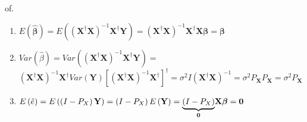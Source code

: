 \documentclass{article}
\begin{document}
\bigskip

of.

\begin{enumerate}
\item $E\left( \mathbf{\hat{\beta}}\right) =E\left( \left( \mathbf{X}%
^{\dagger }\mathbf{X}\right) ^{-1}\mathbf{X}^{\dagger }\mathbf{Y}\right)
=\left( \mathbf{X}^{\dagger }\mathbf{X}\right) ^{-1}\mathbf{X}^{\dagger }%
\mathbf{X\beta =\beta }$

\item $Var\left( \hat{\beta}\right) =Var\left( \left( \mathbf{X}^{\dagger }%
\mathbf{X}\right) ^{-1}\mathbf{X}^{\dagger }\mathbf{Y}\right) =$\newline
$\left( \mathbf{X}^{\dagger }\mathbf{X}\right) ^{-1}\mathbf{X}^{\dagger
}Var\left( \mathbf{Y}\right) \left[ \left( \mathbf{X}^{\dagger }\mathbf{X}%
\right) ^{-1}\mathbf{X}^{\dagger }\right] ^{\dagger }=\sigma ^{2}I\left( 
\mathbf{X}^{\dagger }\mathbf{X}\right) ^{-1}\mathbf{=}\sigma ^{2}P_{\mathbf{X%
}}P_{\mathbf{X}}=\sigma ^{2}P_{\mathbf{X}}$

\item $E\left( \hat{e}\right) =E\left( \left( I-P_{X}\right) \mathbf{Y}%
\right) =\left( I-P_{X}\right) E\left( \mathbf{Y}\right) =\underset{%
\boldsymbol{0}}{\underbrace{\left( I-P_{X}\right) }}\mathbf{X\beta =0}$
\end{enumerate}
\end{document}
